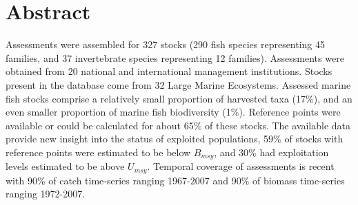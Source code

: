 \section*{Abstract}

Assessments were assembled for 327 stocks
(290 fish species representing
45 families, and 37
invertebrate species representing 12
families). Assessments were obtained from 20 national
and international management institutions. Stocks
present in the database come from 32 Large
Marine Ecosystems. Assessed marine fish stocks
comprise a relatively small proportion of harvested taxa
(17\%), and an even smaller proportion of
marine fish biodiversity (1\%). Reference
points were available or could be calculated for about
65\% of these stocks. The available data
provide new insight into the status of exploited populations,
59\% of stocks with reference points
were estimated to be below $B_{msy}$, and
30\% had exploitation levels
estimated to be above $U_{msy}$. Temporal coverage of assessments is
recent with 90\% of catch time-series ranging 1967-2007
and 90\% of biomass time-series ranging 1972-2007.


